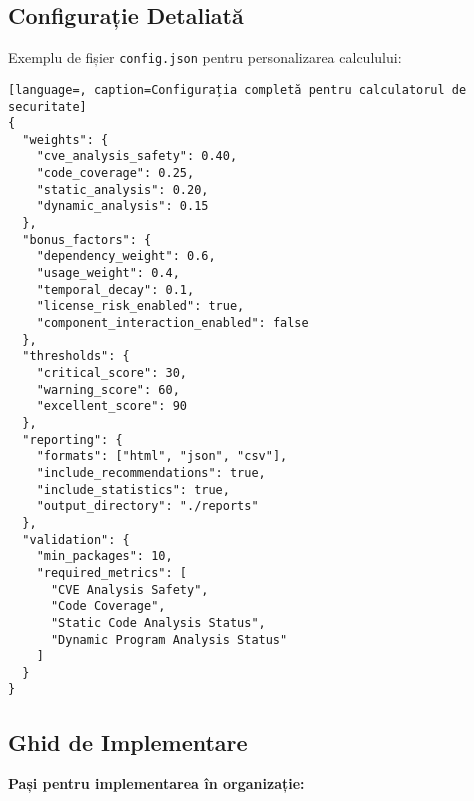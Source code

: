 \documentclass[12pt,a4paper]{article}
\begin{document}
\subsection{Configurație Detaliată}

Exemplu de fișier \texttt{config.json} pentru personalizarea calculului:

\begin{lstlisting}[language=, caption=Configurația completă pentru calculatorul de securitate]
{
  "weights": {
    "cve_analysis_safety": 0.40,
    "code_coverage": 0.25,
    "static_analysis": 0.20,
    "dynamic_analysis": 0.15
  },
  "bonus_factors": {
    "dependency_weight": 0.6,
    "usage_weight": 0.4,
    "temporal_decay": 0.1,
    "license_risk_enabled": true,
    "component_interaction_enabled": false
  },
  "thresholds": {
    "critical_score": 30,
    "warning_score": 60,
    "excellent_score": 90
  },
  "reporting": {
    "formats": ["html", "json", "csv"],
    "include_recommendations": true,
    "include_statistics": true,
    "output_directory": "./reports"
  },
  "validation": {
    "min_packages": 10,
    "required_metrics": [
      "CVE Analysis Safety",
      "Code Coverage",
      "Static Code Analysis Status",
      "Dynamic Program Analysis Status"
    ]
  }
}
\end{lstlisting}

\subsection{Ghid de Implementare}

\textbf{Pași pentru implementarea în organizație:}
\end{document}
